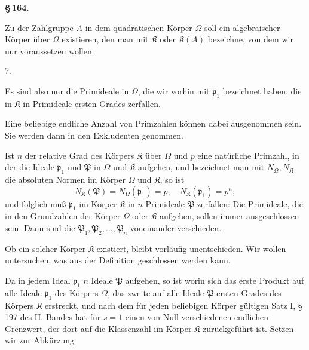 
\begin{center}
\textbf{\S\,164.\qquad {}}
\end{center}

Zu der Zahlgruppe $A$ in dem quadratischen Körper $\Omega$ soll ein algebraischer Körper über $\Omega$ existieren, den man mit $\mathfrak{K}$ oder $\mathfrak{K}(A)$ bezeichne, von dem wir nur voraussetzen wollen:

7. 


Es sind also nur die Primideale in $\Omega$, die wir vorhin mit $\mathfrak{p}_1$ bezeichnet haben, die in $\mathfrak{K}$ in Primideale ersten Grades zerfallen.

Eine beliebige endliche Anzahl von Primzahlen können dabei ausgenommen sein. Sie werden dann in den Exkludenten genommen.

Ist $n$ der relative Grad des Körpers $\mathfrak{K}$ über $\Omega$ und $p$ eine natürliche Primzahl, in der die Ideale $\mathfrak{p}_1$ und $\mathfrak{P}$ in $\Omega$ und $\mathfrak{K}$ aufgehen, und bezeichnet man mit $N_\Omega, N_\mathfrak{K}$ die absoluten Normen im Körper $\Omega$ und $\mathfrak{K}$, so ist
\[
N_\mathfrak{K}(\mathfrak{P}) = N_\Omega(\mathfrak{p}_1) = p, \quad N_\mathfrak{K}(\mathfrak{p}_1) = p^n,
\]
und folglich muß $\mathfrak{p}_1$ im Körper $\mathfrak{K}$ in $n$ Primideale $\mathfrak{P}$ zerfallen:
Die Primideale, die in den Grundzahlen der Körper $\Omega$ oder $\mathfrak{K}$ aufgehen, sollen immer ausgeschlossen sein. Dann sind die $\mathfrak{P}_1, \mathfrak{P}_2, \ldots, \mathfrak{P}_n$ voneinander verschieden.

Ob ein solcher Körper $\mathfrak{K}$ existiert, bleibt vorläufig unentschieden. Wir wollen untersuchen, was aus der Definition geschlossen werden kann.

Da in jedem Ideal $\mathfrak{p}_1$ $n$ Ideale $\mathfrak{P}$ aufgehen, so ist
worin sich das erste Produkt auf alle Ideale $\mathfrak{p}_1$ des Körpers $\Omega$, das zweite auf alle Ideale $\mathfrak{P}$ ersten Grades des Körpers $\mathfrak{K}$ erstreckt, und nach dem für jeden beliebigen Körper gültigen Satz I, § 197 des II. Bandes hat
für $s=1$ einen von Null verschiedenen endlichen Grenzwert, der dort auf die Klassenzahl im Körper $\mathfrak{K}$ zurückgeführt ist. Setzen wir zur Abkürzung
